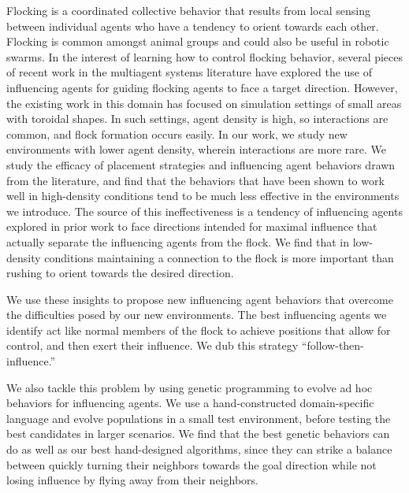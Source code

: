 
Flocking is a coordinated collective behavior that results from local sensing
between individual agents who have a tendency to orient towards each other.
Flocking is common amongst animal groups and could also be useful in robotic
swarms.
In the interest of learning how to control flocking behavior, several pieces
of recent work in the multiagent systems literature have explored the use of
influencing agents for guiding flocking agents to face a target direction.
However, the existing work in this domain has focused on simulation settings
of small areas with toroidal shapes.
In such settings, agent density is high, so interactions are common, and
flock formation occurs easily.
In our work, we study new environments with lower agent density, wherein
interactions are more rare.
We study the efficacy of placement strategies and influencing agent behaviors
drawn from the literature, and find that the behaviors that have been shown to
work well in high-density conditions tend to be much less effective in the
environments we introduce.
The source of this ineffectiveness is a tendency of influencing agents explored
in prior work to face directions intended for maximal influence that actually
separate the influencing agents from the flock.
We find that in low-density conditions maintaining a connection to the flock is
more important than rushing to orient towards the desired direction.

We use these insights to propose new influencing agent behaviors that overcome
the difficulties posed by our new environments.
The best influencing agents we identify act like normal members of the flock to
achieve positions that allow for control, and then exert their influence.  
We dub this strategy ``follow-then-influence.''

We also tackle this problem by using genetic programming to evolve ad hoc
behaviors for influencing agents.
We use a hand-constructed domain-specific language and evolve populations in
a small test environment, before testing the best candidates in larger
scenarios.
We find that the best genetic behaviors can do as well as our best
hand-designed algorithms, since they can strike a balance between quickly
turning their neighbors towards the goal direction while not losing influence
by flying away from their neighbors.
